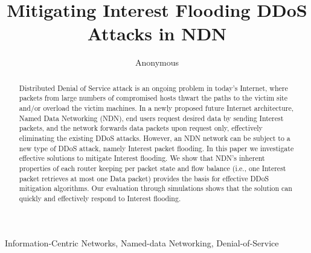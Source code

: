 \documentclass[conference]{IEEEtran}
\title{Mitigating Interest Flooding DDoS Attacks in NDN}%
\author{Anonymous}
\begin{document}
\maketitle

\begin{abstract}
Distributed Denial of Service attack is an ongoing problem in today's Internet, where packets from large numbers of compromised hosts thwart the paths to the victim site and/or overload the victim machines. 
In a newly proposed future Internet architecture, Named Data Networking (NDN), end users request desired data by sending Interest packets, and the network forwards data packets upon request only, effectively eliminating the existing DDoS attacks. 
However, an NDN network can be subject to a new type of DDoS attack, namely Interest packet flooding.  
In this paper we investigate effective solutions to mitigate Interest flooding.
We show that NDN's inherent properties of each router keeping per packet state and flow balance (i.e., one Interest packet retrieves at most one Data packet) provides the  basis for effective DDoS mitigation algorithms.
Our evaluation through simulations shows that the solution can quickly and effectively respond to Interest flooding.
\end{abstract}

\begin{IEEEkeywords}
Information-Centric Networks, Named-data Networking, Denial-of-Service
\end{IEEEkeywords}





















{\small 

}
\end{document}
